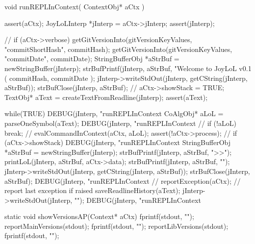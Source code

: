 \startCCode
void runREPLInContext(
  ContextObj* aCtx
) {
  assert(aCtx);
  JoyLoLInterp *jInterp = aCtx->jInterp;
  assert(jInterp);
  
//  if (aCtx->verbose) {
    getGitVersionInto(gitVersionKeyValues, "commitShortHash", commitHash);
    getGitVersionInto(gitVersionKeyValues, "commitDate",      commitDate);
    StringBufferObj *aStrBuf = newStringBuffer(jInterp);
    strBufPrintf(jInterp, aStrBuf, "Welcome to JoyLoL v0.1 ( %
      commitHash,
      commitDate
    );
    jInterp->writeStdOut(jInterp, getCString(jInterp, aStrBuf));
    strBufClose(jInterp, aStrBuf);
//  }
  aCtx->showStack = TRUE;
  TextObj* aText = createTextFromReadline(jInterp);
  assert(aText);
  
  while(TRUE) {
    DEBUG(jInterp, "runREPLInContext %
    CoAlgObj* aLoL = parseOneSymbol(aText);
    DEBUG(jInterp, "runREPLInContext %
    //
    if (!aLoL) break;
    //
    evalCommandInContext(aCtx, aLoL);
    assert(!aCtx->process);
    //
    if (aCtx->showStack) {
      DEBUG(jInterp, "runREPLInContext %
      StringBufferObj *aStrBuf = newStringBuffer(jInterp);
      strBufPrintf(jInterp, aStrBuf, ">>");
      printLoL(jInterp, aStrBuf, aCtx->data);
      strBufPrintf(jInterp, aStrBuf, "\n");
      jInterp->writeStdOut(jInterp, getCString(jInterp, aStrBuf));
      strBufClose(jInterp, aStrBuf);
      DEBUG(jInterp, "runREPLInContext %
    }
    //
    reportException(aCtx); // report last exception if raised
  }
  saveReadlineHistory(aText);
  jInterp->writeStdOut(jInterp, "\n");
  DEBUG(jInterp, "runREPLInContext %
}
\stopCCode

\starttyping
static void showVersionsAP(Context* aCtx) {
  fprintf(stdout, "\n");
  reportMainVersions(stdout);
  fprintf(stdout, "\n");
  reportLibVersions(stdout);
  fprintf(stdout, "\n");
}
\stoptyping